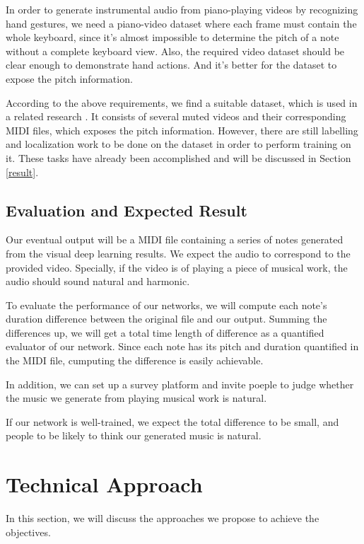 \documentclass[10pt,twocolumn,letterpaper]{article}
\begin{document}
In order to generate instrumental audio from piano-playing videos by recognizing hand gestures, we need a piano-video dataset where each frame must contain the whole keyboard, since it's almost impossible to determine the pitch of a note without a complete keyboard view.
Also, the required video dataset should be clear enough to demonstrate hand actions. And it's better for the dataset to expose the pitch information.

According to the above requirements, we find a suitable dataset, which is used in a related research \cite{Akbari}. It consists of several muted videos and their corresponding MIDI files, which exposes the pitch information.
However, there are still labelling and localization work to be done on the dataset in order to perform training on it. These tasks have already been accomplished and will be discussed in Section \ref{result}.

\subsection{Evaluation and Expected Result}
\label{evaluation}

Our eventual output will be a MIDI file containing a series of notes generated from the visual deep learning results. We expect the audio to correspond to the provided video. Specially, if the video is of playing a piece of musical work, the audio should sound natural and harmonic.

To evaluate the performance of our networks, we will compute each note's duration difference between the original file and our output. Summing the differences up, we will get a total time length of difference as a quantified evaluator of our network. Since each note has its pitch and duration quantified in the MIDI file, cumputing the difference is easily achievable.

In addition, we can set up a survey platform and invite poeple to judge whether the music we generate from playing musical work is natural.

If our network is well-trained, we expect the total difference to be small, and people to be likely to think our generated music is natural.

\section{Technical Approach}
\label{approach}

In this section, we will discuss the approaches we propose to achieve the objectives.
\end{document}
